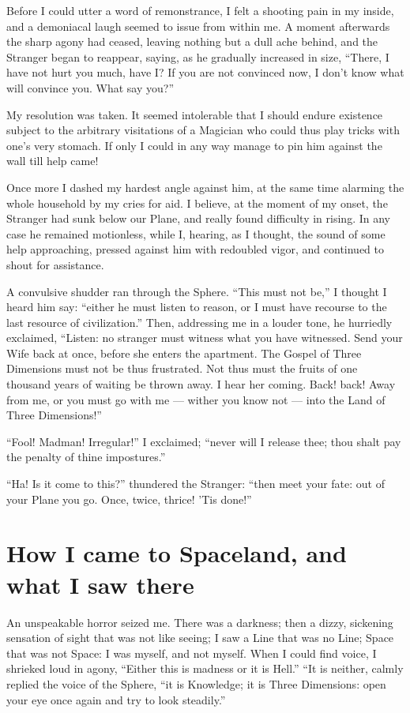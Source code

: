 \documentclass[10pt, kindle, oneside]{kindle}
\begin{document}
Before I could utter a word of remonstrance, I felt a shooting pain in my
inside, and a demoniacal laugh seemed to issue from within me. A moment
afterwards the sharp agony had ceased, leaving nothing but a dull ache behind,
and the Stranger began to reappear, saying, as he gradually increased in size,
``There, I have not hurt you much, have I? If you are not convinced now, I
don't know what will convince you. What say you?''

My resolution was taken. It seemed intolerable that I should endure existence
subject to the arbitrary visitations of a Magician who could thus play tricks
with one's very stomach. If only I could in any way manage to pin him against
the wall till help came!

Once more I dashed my hardest angle against him, at the same time alarming the
whole household by my cries for aid. I believe, at the moment of my onset, the
Stranger had sunk below our Plane, and really found difficulty in rising. In
any case he remained motionless, while I, hearing, as I thought, the sound of
some help approaching, pressed against him with redoubled vigor, and continued
to shout for assistance.

A convulsive shudder ran through the Sphere. ``This must not be,'' I thought I
heard him say: ``either he must listen to reason, or I must have recourse to
the last resource of civilization.'' Then, addressing me in a louder tone, he
hurriedly exclaimed, ``Listen: no stranger must witness what you have
witnessed. Send your Wife back at once, before she enters the apartment. The
Gospel of Three Dimensions must not be thus frustrated. Not thus must the
fruits of one thousand years of waiting be thrown away. I hear her coming.
Back! back! Away from me, or you must go with me --- wither you know not --- into
the Land of Three Dimensions!''

``Fool! Madman! Irregular!'' I exclaimed; ``never will I release thee; thou shalt
pay the penalty of thine impostures.''

``Ha! Is it come to this?'' thundered the Stranger: ``then meet your fate: out of
your Plane you go. Once, twice, thrice! 'Tis done!''


\chapter{How I came to Spaceland, and what I saw there}


An unspeakable horror seized me. There was a darkness; then a dizzy, sickening
sensation of sight that was not like seeing; I saw a Line that was no Line;
Space that was not Space: I was myself, and not myself. When I could find
voice, I shrieked loud in agony, ``Either this is madness or it is Hell.'' ``It
is neither, calmly replied the voice of the Sphere, ``it is Knowledge; it is
Three Dimensions: open your eye once again and try to look steadily.''
\end{document}

